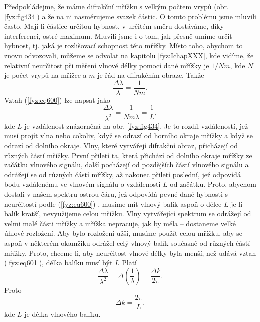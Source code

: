     Předpokládejme, že máme difrakční mřížku s velkým počtem vrypů (obr. \ref{fyz:fig434}) a že na
    ni nasměrujeme svazek částic. O tomto problému jsme mluvili často. Mají-li částice určitou
    hybnost, v určitém směru dostáváme, díky interferenci, ostré maximum. Mluvili jsme i o tom, jak
    přesně umíme určit hybnost, tj. jaká je rozlišovací schopnost této mřížky. Místo toho, abychom
    to znovu odvozovali, můžeme se odvolat na kapitolu \ref {fyz:IchapXXX}, kde vidíme, že relativní
    neurčitost při měření vlnové délky pomocí dané mřížky je \(1/Nm\), kde \(N\) je počet vrypů na
    mřížce a \(m\) je řád na difrakčním obraze. Takže
    \begin{equation}\label{fyz:eq600}
      \frac{Δλ}{λ}=\frac{1}{Nm}.
    \end{equation}
    Vztah (\ref{fyz:eq600}) lze napsat jako
    \begin{equation}\label{fyz:eq601}
      \frac{Δλ}{λ^2} = \frac{1}{Nmλ} = \frac{1}{L},
    \end{equation} 
    kde \(L\) je vzdálenost znázorněná na obr. \ref{fyz:fig434}. Je to rozdíl vzdáleností, jež musí
    projít vlna nebo cokoliv, když se odrazí od horního okraje mřížky a když se odrazí od dolního
    okraje. Vlny, které vytvářejí difrakční obraz, přicházejí od různých částí mřížky. První přiletí
    ta, která přichází od dolního okraje mřížky ze začátku vlnového signálu, další pocházejí od
    pozdějších částí vlnového signálu a odrážejí se od různých částí mřížky, až nakonec přiletí
    poslední, jež odpovídá bodu vzdálenému ve vlnovém signálu o vzdálenosti \(L\) od začátku. Proto,
    abychom dostali v našem spektru ostrou čáru, jež odpovídá pevné dané hybnosti s neurčitostí
    podle (\ref{fyz:eq600}) , musíme mít vlnový balík aspoň o délce \(L\) je-li balík kratší,
    nevyužijeme celou mřížku. Vlny vytvářející spektrum se odrážejí od velmi malé části mřížky a
    mřížka nepracuje, jak by měla – dostaneme velké úhlové rozložení. Aby bylo rozložení užší,
    musíme použít celou mřížku, aby se aspoň v některém okamžiku odrážel celý vlnový balík současně
    od různých částí mřížky. Proto, chceme-li, aby neurčitost vlnové délky byla menší, než udává
    vztah (\ref{fyz:eq601}), délka balíku musí být \(L\) Platí   
    \begin{equation*}
      \frac{Δλ}{λ^2} = Δ\left(\frac{1}{λ}\right)=\frac{Δk}{2π}.
    \end{equation*} 
    Proto
    \begin{equation}\label{fyz:eq602}
      Δk=\frac{2π}{L}.
    \end{equation} 
    kde \(L\) je délka vlnového balíku.

